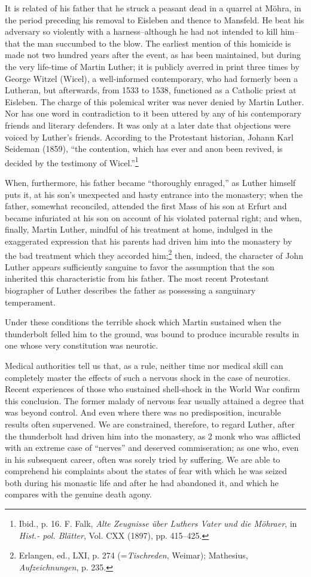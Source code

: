 It is related of his father that he struck a peasant dead in a
quarrel at Möhra, in the period preceding his removal to Eisleben
and thence to Mansfeld. He beat his adversary so violently with
a harness--although he had not intended to kill him--that the
man succumbed to the blow. The earliest mention of this homicide
is made not two hundred years after the event, as has been maintained,
but during the very life-time of Martin Luther; it is publicly averred
in print three times by George Witzel (Wicel), a well-informed
contemporary, who had formerly been a Lutheran, but afterwards,
from 1533 to 1538, functioned as a Catholic priest at Eisleben. The
charge of this polemical writer was never denied by Martin Luther.
Nor has one word in contradiction to it been uttered by any of his
contemporary friends and literary defenders. It was only at a later
date that objections were voiced by Luther’s friends. According to
the Protestant historian, Johann Karl Seideman (1859), “the contention,
which has ever and anon been revived, is decided by the testimony of Wicel.”\footnote
{Ibid., p. 16. F. Falk, \textit{Alte Zeugnisse über Luthers Vater und die Möhraer}, in \textit{Hist.- pol. Blätter}, Vol. CXX (1897), pp. 415--425.}

When, furthermore, his father became “thoroughly enraged,” as
Luther himself puts it, at his son’s unexpected and hasty entrance
into the monastery; when the father, somewhat reconciled, attended
the first Mass of his son at Erfurt and became infuriated at his
son on account of his violated paternal right; and when, finally,
Martin Luther, mindful of his treatment at home, indulged in the
exaggerated expression that his parents had driven him into the
monastery by the bad treatment which they accorded him;\footnote
{Erlangen, ed., LXI, p. 274 (=\textit{Tischreden}, Weimar); Mathesius, \textit{Aufzeichnungen}, p. 235.}
then, indeed, the character of John Luther appears sufficiently sanguine
to favor the assumption that the son inherited this characteristic
from his father. The most recent Protestant biographer of Luther
describes the father as possessing a sanguinary temperament.

Under these conditions the terrible shock which Martin sustained
when the thunderbolt felled him to the ground, was bound to produce
incurable results in one whose very constitution was neurotic.

Medical authorities tell us that, as a rule, neither time nor medical
skill can completely master the effects of such a nervous shock in
the case of neurotics. Recent experiences of those who sustained
shell-shock in the World War confirm this conclusion. The former
malady of nervous fear usually attained a degree that was beyond
control. And even where there was no predisposition, incurable
results often supervened. We are constrained, therefore, to regard
Luther, after the thunderbolt had driven him into the monastery,
as 2 monk who was afflicted with an extreme case of “nerves” and
deserved commiseration; as one who, even in his subsequent career,
often was sorely tried by suffering. We are able to comprehend his
complaints about the states of fear with which he was seized both
during his monastic life and after he had abandoned it, and which
he compares with the genuine death agony.

